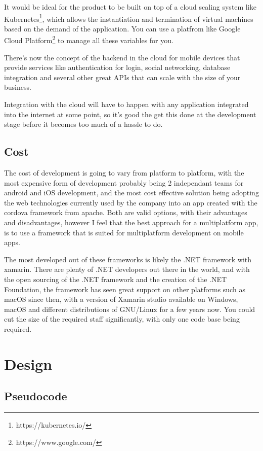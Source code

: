\documentclass{scrreprt}
\begin{document}
It would be ideal for the product to be built on top of a cloud scaling system like Kubernetes\footnote{https://kubernetes.io/}, which allows the instantiation and termination of virtual machines based on the demand of the application. You can use a platfrom like Google Cloud Platform\footnote{https://www.google.com/} to manage all these variables for you.

There's now the concept of the backend in the cloud for mobile devices that provide services like authentication for login, social networking, database integration and several other great APIs that can scale with the size of your business.

Integration with the cloud will have to happen with any application integrated into the internet at some point, so it's good the get this done at the development stage before it becomes too much of a hassle to do.

\section{Cost}

The cost of development is going to vary from platform to platform, with the most expensive form of development probably being 2 independant teams for android and iOS development, and the most cost effective solution being adopting the web technologies currently used by the company into an app created with the cordova framework from apache. Both are valid options, with their advantages and disadvantages, however I feel that the best approach for a multiplatform app, is to use a framework that is suited for multiplatform development on mobile apps.

The most developed out of these frameworks is likely the .NET framework with xamarin. There are plenty of .NET developers out there in the world, and with the open sourcing of the .NET framework and the creation of the .NET Foundation, the framework has seen great support on other platforms such as macOS since then, with a version of Xamarin studio available on Windows, macOS and different distributions of GNU/Linux for a few years now. You could cut the size of the required staff significantly, with only one code base being required.
\chapter{Design}\label{design}

\section{Pseudocode}
\end{document}
